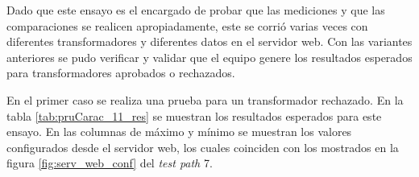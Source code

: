 Dado que este ensayo es el encargado de probar que las mediciones y que las comparaciones se realicen apropiadamente, este se corrió varias veces con diferentes transformadores y diferentes datos en el servidor web. Con las variantes anteriores se pudo verificar y validar que el equipo genere los resultados esperados para transformadores aprobados o rechazados.

En el primer caso se realiza una prueba para un transformador rechazado. En la tabla \ref{tab:pruCarac_11_res} se muestran los resultados esperados para este ensayo. En las columnas de máximo y mínimo se muestran los valores configurados desde el servidor web, los cuales coinciden con los mostrados en la figura \ref{fig:serv_web_conf} del \textit{test path} 7.

\begin{table}[htpb]
\centering
\caption[Ensayo para transformador rechazado]{Resultados esperados para el \textit{test path} 11 en la condición de transformador rechazado}
\label{tab:pruCarac_11_res}
\end{table}

